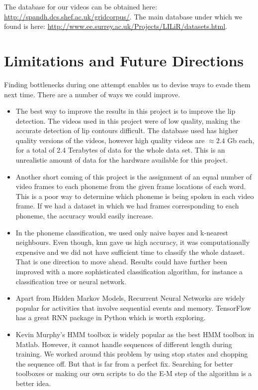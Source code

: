 \documentclass[a4paper]{article}
\begin{document}
The database for our videos can be obtained here: \url{http://spandh.dcs.shef.ac.uk/gridcorpus/}. The main database under which we found is here: \url{http://www.ee.surrey.ac.uk/Projects/LILiR/datasets.html}.
 

\section{Limitations and Future Directions}

Finding bottlenecks during one attempt enables us to devise ways to evade them next time. There are a number of ways we could improve.
\begin{itemize}
	\item The best way to improve the results in this project is to improve the lip detection.  The videos used in this project were of low quality, making the accurate detection of lip contours difficult.  The database used has higher quality versions of the videos, however high quality videos are $\approx 2.4$ Gb each, for a total of 2.4 Terabytes of data for the whole data set.  This is an unrealistic amount of data for the hardware available for this project.
	\item Another short coming of this project is the assignment of an equal number of video frames to each phoneme from the given frame locations of each word.  This is a poor way to determine which phoneme is being spoken in each video frame. If we had a dataset in which we had frames corresponding to each phoneme, the accuracy would easily increase.
	\item In the phoneme classification, we used only naive bayes and k-nearest neighbours. Even though, knn gave us high accuracy, it was computationally expensive and we did not have sufficient time to classify the whole dataset. That is one direction to move ahead. Results could have further been improved with a more sophisticated classification algorithm, for instance a classification tree or neural network.
	\item Apart from Hidden Markov Models, Recurrent Neural Networks are widely popular for activities that involve sequential events and memory. TensorFlow has a great RNN package in Python which is worth exploring.
	\item Kevin Murphy's HMM toolbox is widely popular as the best HMM toolbox in Matlab. However, it cannot handle sequences of different length during training. We worked around this problem by using stop states and chopping the sequence off. But that is far from a perfect fix. Searching for better toolboxes or making our own scripts to do the E-M step of the algorithm is a better idea. 
\end{itemize}
 
\end{document}
